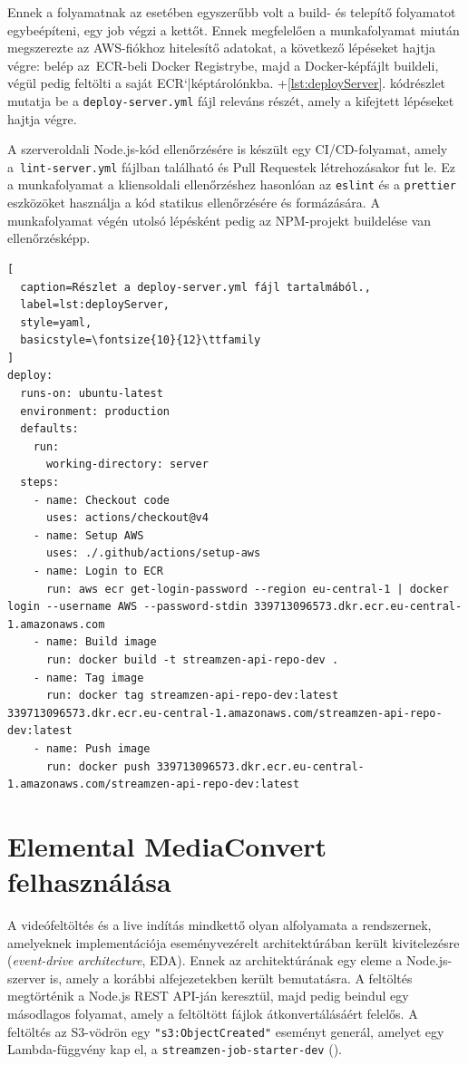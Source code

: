 Ennek a folyamatnak az esetében egyszerűbb volt a build- és telepítő folyamatot egybeépíteni, egy job végzi a kettőt. Ennek megfelelően a munkafolyamat miután megszerezte az AWS-fiókhoz hitelesítő adatokat, a következő lépéseket hajtja végre: belép az~ECR-beli Docker Registrybe, majd a Docker-képfájlt buildeli, végül pedig feltölti a saját ECR`|képtárolónkba. \Az+\ref{lst:deployServer}. kódrészlet mutatja be a \verb|deploy-server.yml| fájl releváns részét, amely a kifejtett lépéseket hajtja végre.

A szerveroldali Node.js-kód ellenőrzésére is készült egy CI/CD-folyamat, amely a~\verb|lint-server.yml| fájlban található és Pull Requestek létrehozásakor fut le. Ez a munkafolyamat a kliensoldali ellenőrzéshez hasonlóan az \verb|eslint| és a \verb|prettier| eszközöket használja a kód statikus ellenőrzésére és formázására. A munkafolyamat végén utolsó lépésként pedig az NPM-projekt buildelése van ellenőrzésképp.

\begin{minipage}{0.92\textwidth}
  \begin{lstlisting}[
  caption=Részlet a deploy-server.yml fájl tartalmából.,
  label=lst:deployServer,
  style=yaml,
  basicstyle=\fontsize{10}{12}\ttfamily
]
deploy:
  runs-on: ubuntu-latest
  environment: production
  defaults:
    run:
      working-directory: server
  steps:
    - name: Checkout code
      uses: actions/checkout@v4
    - name: Setup AWS
      uses: ./.github/actions/setup-aws
    - name: Login to ECR
      run: aws ecr get-login-password --region eu-central-1 | docker login --username AWS --password-stdin 339713096573.dkr.ecr.eu-central-1.amazonaws.com
    - name: Build image
      run: docker build -t streamzen-api-repo-dev .
    - name: Tag image
      run: docker tag streamzen-api-repo-dev:latest 339713096573.dkr.ecr.eu-central-1.amazonaws.com/streamzen-api-repo-dev:latest
    - name: Push image
      run: docker push 339713096573.dkr.ecr.eu-central-1.amazonaws.com/streamzen-api-repo-dev:latest
\end{lstlisting}
\end{minipage}

\section{Elemental MediaConvert felhasználása}\label{sec:mediaConvert}

A videófeltöltés és a live indítás mindkettő olyan alfolyamata a rendszernek, amelyeknek implementációja eseményvezérelt architektúrában került kivitelezésre (\emph{event-drive architecture}, EDA\cite{eda}). Ennek az architektúrának egy eleme a Node.js-szerver is, amely a korábbi alfejezetekben került bemutatásra. A feltöltés megtörténik a Node.js REST API-ján keresztül, majd pedig beindul egy másodlagos folyamat, amely a feltöltött fájlok átkonvertálásáért felelős. A feltöltés az S3-vödrön egy \verb|"s3:ObjectCreated"| eseményt generál, amelyet egy Lambda-függvény kap el, a \verb|streamzen-job-starter-dev| ().

